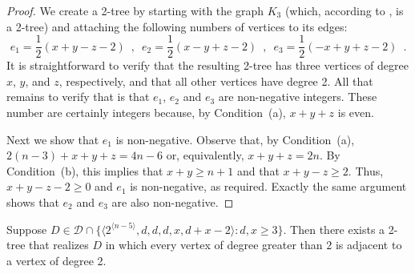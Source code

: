 \documentclass[lotsofwhite,charterfonts]{patmorin}
\newcommand{\rep}[1]{^{\langle#1\rangle}}
\newcommand{\degreesum}{Condition~(a)}
\newcommand{\maxdegree}{Condition~(b)}
\begin{document}
\begin{proof}
We create a 2-tree by starting with the graph $K_3$ (which, according
to , is a
2-tree) and attaching the following numbers of vertices to its edges:
\[
    e_1=\frac{1}{2}(x+y-z-2) \enspace , \enspace
    e_2=\frac{1}{2}(x-y+z-2) \enspace , \enspace 
    e_3=\frac{1}{2}(-x+y+z-2) \enspace .
\]
It is straightforward to verify that the resulting 2-tree has three
vertices of degree $x$, $y$, and $z$, respectively, and that all other
vertices have degree 2.  All that remains to verify that is that
$e_1$, $e_2$ and $e_3$ are non-negative integers.  These number are
certainly integers because, by \degreesum, $x+y+z$ is even.  

Next we show that $e_1$ is non-negative.  Observe that, by \degreesum,
$2(n-3)+x+y+z = 4n-6$ or, equivalently, $x+y+z=2n$.  By \maxdegree,
this implies that $x+y \ge n+1$ and that $x+y-z \ge 2$.  Thus,
$x+y-z-2 \ge 0$ and $e_1$ is non-negative, as required.  
Exactly the same argument shows that $e_2$ and $e_3$ are also
non-negative.
\end{proof}

\begin{lem}
Suppose $D\in \mathcal{D}\cap \{\langle 2\rep{n-5},d,d,d,x,d+x-2 \rangle:
\mbox{$d,x\ge 3$}\}$.
Then there exists a 2-tree that realizes $D$ in which every vertex of
degree greater than $2$ is adjacent to a vertex of degree 2.
\end{lem}
\end{document}
